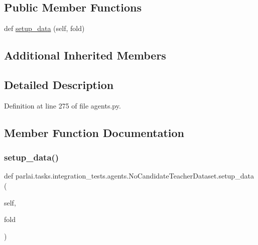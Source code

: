 \subsection*{Public Member Functions}
\begin{DoxyCompactItemize}
\item 
def \hyperlink{classparlai_1_1tasks_1_1integration__tests_1_1agents_1_1NoCandidateTeacherDataset_a668aa7a9cad783f8e0a7f318271dda76}{setup\+\_\+data} (self, fold)
\end{DoxyCompactItemize}
\subsection*{Additional Inherited Members}


\subsection{Detailed Description}


Definition at line 275 of file agents.\+py.



\subsection{Member Function Documentation}
\mbox{\label{classparlai_1_1tasks_1_1integration__tests_1_1agents_1_1NoCandidateTeacherDataset_a668aa7a9cad783f8e0a7f318271dda76}} 
\subsubsection{\texorpdfstring{setup\+\_\+data()}{setup\_data()}}
{\footnotesize\ttfamily def parlai.\+tasks.\+integration\+\_\+tests.\+agents.\+No\+Candidate\+Teacher\+Dataset.\+setup\+\_\+data (\begin{DoxyParamCaption}\item[{}]{self,  }\item[{}]{fold }\end{DoxyParamCaption})}




